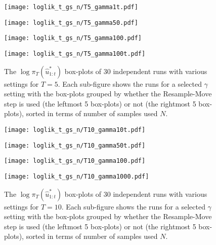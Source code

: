 \begin{figure}[!thbp]
    \centering
    \begin{minipage}{.5\textwidth}
        \centering
        \texttt{[image: loglik\_t\_gs\_n/T5\_gamma1t.pdf]}
    \end{minipage}%
    \begin{minipage}{0.5\textwidth}
        \centering
        \texttt{[image: loglik\_t\_gs\_n/T5\_gamma50.pdf]}
    \end{minipage}
    \begin{minipage}{0.5\textwidth}
        \centering
        \texttt{[image: loglik\_t\_gs\_n/T5\_gamma100.pdf]}
    \end{minipage}%
    \begin{minipage}{0.5\textwidth}
        \centering
        \texttt{[image: loglik\_t\_gs\_n/T5\_gamma100t.pdf]}
    \end{minipage}
    \caption{The $\log\pi_T(\hat{u}^*_{1:t})$ box-plots of 30 independent runs with various settings for $T=5$. Each sub-figure shows the runs for a selected $\gamma$ setting with the box-plots grouped by whether the Resample-Move step is used (the leftmost 5 box-plots) or not (the rightmost 5 box-plots), sorted in terms of number of samples used $N$.}
    \label{fig:rm1}
\end{figure}

\begin{figure}[!thbp]
    \centering
    \begin{minipage}{0.5\textwidth}
        \centering
        \texttt{[image: loglik\_t\_gs\_n/T10\_gamma10t.pdf]}
    \end{minipage}%
    \begin{minipage}{0.5\textwidth}
        \centering
        \texttt{[image: loglik\_t\_gs\_n/T10\_gamma50t.pdf]}
    \end{minipage}
    \begin{minipage}{0.5\textwidth}
        \centering
        \texttt{[image: loglik\_t\_gs\_n/T10\_gamma100.pdf]}
    \end{minipage}%
    \begin{minipage}{0.5\textwidth}
        \centering
        \texttt{[image: loglik\_t\_gs\_n/T10\_gamma1000.pdf]}
    \end{minipage}
    \caption{The $\log\pi_T(\hat{u}^*_{1:t})$ box-plots of 30 independent runs with various settings for $T=10$. Each sub-figure shows the runs for a selected $\gamma$ setting with the box-plots grouped by whether the Resample-Move step is used (the leftmost 5 box-plots) or not (the rightmost 5 box-plots), sorted in terms of number of samples used $N$.}
    \label{fig:rm2}
\end{figure}

